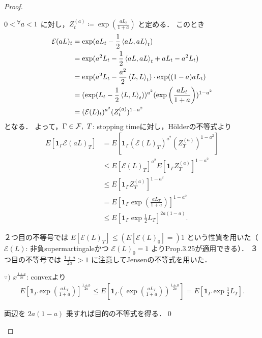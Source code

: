 \documentclass{jsarticle}
\begin{document}
\begin{proof}
\begin{description}
        $0<{}^{\forall} a<1$ に対し，$Z_t^{(a)}\coloneqq\exp(\frac{aL_t}{1+a})$ と定める．
        このとき
        \begin{align}
            \mathcal{E}(aL)_t
            &= \exp(aL_t-\frac{1}{2}\left\langle aL,aL\right\rangle_t) \\
            &= \exp(a^2 L_t-\frac{1}{2}\left\langle aL,aL\right\rangle_t+aL_t-a^2 L_t) \\
            &= \exp(a^2 L_t-\frac{a^2}{2}\left\langle L,L\right\rangle_t)\cdot\exp((1-a)aL_t) \\
            &= (\exp(L_t-\frac{1}{2}\left\langle L,L\right\rangle_t))^{a^2}(\exp\left(\frac{aL_t}{1+a}\right))^{1-a^2} \\
            &= (\mathcal{E}(L)_t)^{a^2}(Z_t^{(a)})^{1-a^2}
        \end{align}
        となる．
        よって，$\Gamma\in\mathcal{F},\ T$: stopping timeに対し，H\"{o}lderの不等式より
        \begin{align}
            E[\bm{1}_\Gamma\mathcal{E}(aL)_T]
            &= E[\bm{1}_\Gamma(\mathcal{E}(L)_T)^{a^2}(Z_T^{(a)})^{1-a^2}] \\
            &\le E[\mathcal{E}(L)_T]^{a^2}
            E[\bm{1}_\Gamma Z_T^{(a)}]^{1-a^2} \\
            &\le E[\bm{1}_\Gamma Z_T^{(a)}]^{1-a^2} \\
            &= E[\bm{1}_\Gamma\exp\left(\frac{aL_T}{1+a}\right)]^{1-a^2} \\
            &\le E[\bm{1}_\Gamma\exp\frac{1}{2}L_T]^{2a(1-a)}.
        \end{align}

        ２つ目の不等号では $E[\mathcal{E}(L)_T]\le(E[\mathcal{E}(L)_0]=)1$ という性質を用いた（$\mathcal{E}(L)$: 非負supermartingaleかつ $\mathcal{E}(L)_0=1$ よりProp.3.25が適用できる）．
        ３つ目の不等号では $\frac{1+a}{2a}>1$ に注意してJensenの不等式を用いた．

        $\because)$ $x^{\frac{1+a}{2a}}$: convexより
        \begin{align}
            E[\bm{1}_\Gamma\exp\left(\frac{aL_T}{1+a}\right)]^{\frac{1+a}{2a}}
            \le E[\bm{1}_\Gamma(\exp\left(\frac{aL_T}{1+a}\right))^{\frac{1+a}{2a}}]
            = E[\bm{1}_\Gamma\exp\frac{1}{2}L_T].
        \end{align}

        両辺を $2a(1-a)$ 乗すれば目的の不等式を得る．\qed
        

\end{description}
\end{proof}
\end{document}
